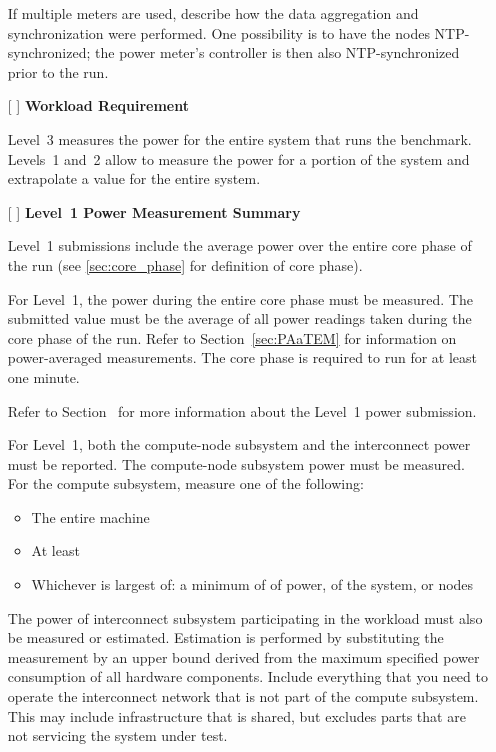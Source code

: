 \begin{itemize}
If multiple meters are used, describe how the data aggregation and synchronization were performed.
One possibility is to have the nodes NTP-synchronized; the power meter's controller is then also NTP-synchronized prior to the run.

\item[{[ ]}]
\textbf{Workload Requirement}

Level~3 measures the power for the entire system that runs the benchmark.
Levels~1 and~2 allow to measure the power for a portion of the system and extrapolate a value for the entire system.

\item[{[ ]}]
\textbf{Level~1 Power Measurement Summary}

Level~1 submissions include the average power over the entire core phase of the run (see \ref{sec:core_phase} for definition of core phase).

For Level~1, the power during the entire core phase must be measured.
The submitted value must be the average of all power readings taken during the core phase of the run.
Refer to Section~\ref{sec:PAaTEM} for information on power-averaged measurements.
The core phase is required to run for at least one minute.

Refer to Section~ for more information about the Level~1 power submission.

For Level~1, both the compute-node subsystem and the interconnect power must be reported.
The compute-node subsystem power must be measured.
For the compute subsystem, measure one of the following:
\begin{itemize}
\item The entire machine
\item At least \SpecPowerMaxLOne{}
\item Whichever is largest of: a minimum of \SpecPowerMinLOne{} of power, \SpecFracMinLOne{} of the system, or \SpecMinNodes{} nodes
\end{itemize}

The power of interconnect subsystem participating in the workload must also be measured or estimated.
Estimation is performed by substituting the measurement by an upper bound derived from the maximum specified power consumption of all hardware components.
Include everything that you need to operate the interconnect network that is not part of the compute subsystem.
This may include infrastructure that is shared, but excludes parts that are not servicing the system under test.


\end{itemize}
